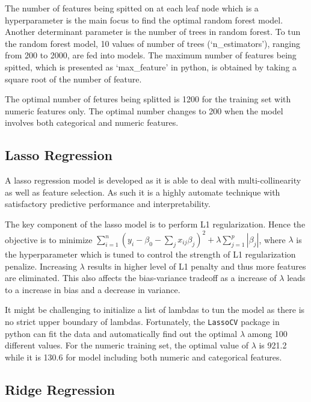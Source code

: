 \documentclass[letterpaper,12pt,twoside,]{pinp}
\begin{document}
The number of features being spitted on at each leaf node which is a
hyperparameter is the main focus to find the optimal random forest
model. Another determinant parameter is the number of trees in random
forest. To tun the random forest model, 10 values of number of trees
(`n\_estimators'), ranging from 200 to 2000, are fed into models. The
maximum number of features being spitted, which is presented as
`max\_feature' in python, is obtained by taking a square root of the
number of feature.

The optimal number of fetures being splitted is 1200 for the training
set with numeric features only. The optimal number changes to 200 when
the model involves both categorical and numeric features.

\hypertarget{lasso-regression}{%
\subsection{Lasso Regression}\label{lasso-regression}}

A lasso regression model is developed as it is able to deal with
multi-collinearity as well as feature selection. As such it is a highly
automate technique with satisfactory predictive performance and
interpretability.

The key component of the lasso model is to perform L1 regularization.
Hence the objective is to minimize
\(\sum^n_{i=1}(y_i-\beta_0-\sum_jx_{ij}\beta_j)^2+\lambda\sum^p_{j=1}|\beta_j|\),
where \(\lambda\) is the hyperparameter which is tuned to control the
strength of L1 regularization penalize. Increasing \(\lambda\) results
in higher level of L1 penalty and thus more features are eliminated.
This also affects the bias-variance tradeoff as a increase of
\(\lambda\) leads to a increase in bias and a decrease in variance.

It might be challenging to initialize a list of lambdas to tun the model
as there is no strict upper boundary of lambdas. Fortunately, the
\texttt{LassoCV} package in python can fit the data and automatically
find out the optimal \(\lambda\) among 100 different values. For the
numeric training set, the optimal value of \(\lambda\) is 921.2 while it
is 130.6 for model including both numeric and categorical features.

\hypertarget{ridge-regression}{%
\subsection{Ridge Regression}\label{ridge-regression}}
\end{document}
